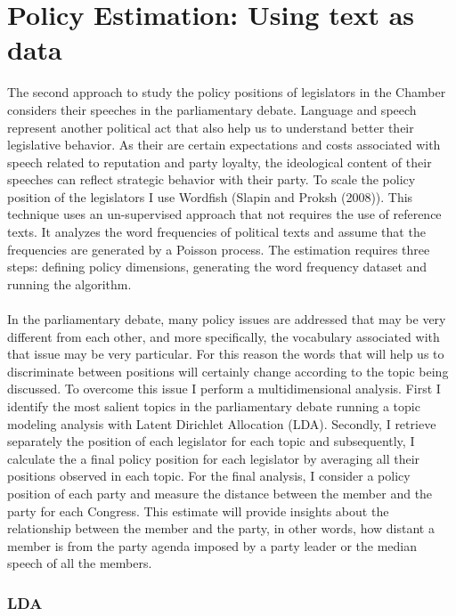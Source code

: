 \documentclass{article}
\begin{document}
\section{Policy Estimation: Using text as data}

The second approach to study the policy positions of legislators in the Chamber considers their speeches in the parliamentary debate. Language and speech represent another political act that also help us to understand better their legislative behavior. As their are certain expectations and costs associated with speech related to reputation and party loyalty, the ideological content of their speeches can reflect strategic behavior with their party. To scale the policy position of the legislators I use Wordfish (Slapin and Proksh (2008)). This technique uses an un-supervised approach that not requires the use of reference texts. It analyzes the word frequencies of political texts and assume that the frequencies are generated by a Poisson process. The estimation requires three steps: defining policy dimensions, generating the word frequency dataset and running the algorithm. \\
\\
In the parliamentary debate, many policy issues are addressed that may be very different from each other, and more specifically, the vocabulary associated with that issue may be very particular. For this reason the words that will help us to discriminate between positions will certainly change according to the topic being discussed. To overcome this issue I perform a multidimensional analysis. First I identify the most salient topics in the parliamentary debate running a topic modeling analysis with Latent Dirichlet Allocation (LDA). Secondly, I retrieve separately the position of each legislator for each topic and subsequently, I calculate the a final policy position for each legislator by averaging all their positions observed in each topic. For the final analysis, I consider a policy position of each party and measure the distance between the member and the party for each Congress. This estimate will provide insights about the relationship between the member and the party, in other words, how distant a member is from the party agenda imposed by a party leader or the median speech of all the members. 

\subsubsection{LDA}
\end{document}
